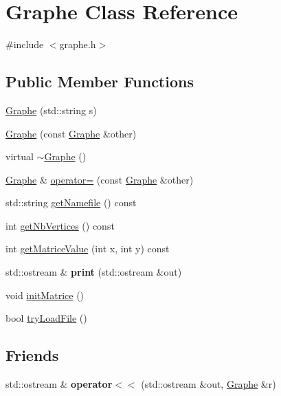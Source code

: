 \hypertarget{classGraphe}{\section{Graphe Class Reference}
\label{classGraphe}
}


{\ttfamily \#include $<$graphe.\-h$>$}

\subsection*{Public Member Functions}
\begin{DoxyCompactItemize}
\item 
\hyperlink{classGraphe_a93e104c07aae2f616f95069bf175840d}{Graphe} (std\-::string s)
\item 
\hyperlink{classGraphe_a7489826337c043e6b8b4b9c7b5f23bf7}{Graphe} (const \hyperlink{classGraphe}{Graphe} \&other)
\item 
virtual \hyperlink{classGraphe_a673c897db564767e9ace7169a5357310}{$\sim$\-Graphe} ()
\item 
\hyperlink{classGraphe}{Graphe} \& \hyperlink{classGraphe_a55fce2b847c21bc53b03275e405feb09}{operator=} (const \hyperlink{classGraphe}{Graphe} \&other)
\item 
std\-::string \hyperlink{classGraphe_a76ddb20acf15bafd5bc4b42df0355149}{get\-Namefile} () const 
\item 
int \hyperlink{classGraphe_a12d073cd0ec41d9836986d5bc51af9ae}{get\-Nb\-Vertices} () const 
\item 
int \hyperlink{classGraphe_ae308092bd64c99c48f90cf1a3538d2a4}{get\-Matrice\-Value} (int x, int y) const 
\item 
\hypertarget{classGraphe_ae452624553bcf841197c507a26e1f40a}{std\-::ostream \& {\bfseries print} (std\-::ostream \&out)}\label{classGraphe_ae452624553bcf841197c507a26e1f40a}

\item 
void \hyperlink{classGraphe_a5692ffdb32b28e8f2b3e8276b8298dc3}{init\-Matrice} ()
\item 
bool \hyperlink{classGraphe_a3cd74bcf2ab28ac5344d9c7eac0cfeaf}{try\-Load\-File} ()
\end{DoxyCompactItemize}
\subsection*{Friends}
\begin{DoxyCompactItemize}
\item 
\hypertarget{classGraphe_acd2c4e2abc489731b8673977e9c91c6e}{std\-::ostream \& {\bfseries operator$<$$<$} (std\-::ostream \&out, \hyperlink{classGraphe}{Graphe} \&r)}\label{classGraphe_acd2c4e2abc489731b8673977e9c91c6e}

\end{DoxyCompactItemize}


